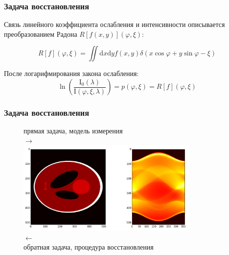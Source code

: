 \documentclass[12pt]{beamer}
\begin{document}
\begin{frame}
\frametitle{Задача восстановления}
  Связь линейного коэффициента ослабления и интенсивности описывается преобразованием Радона $R[f(x,y)](\varphi, \xi)$:

  $$
  R[f](\varphi, \xi) = 
 \iint \! \mathrm d x \mathrm d y f(x,y)\delta(x\cos\varphi + y\sin\varphi - \xi)
  $$


  После логарифмирования закона ослабления:
  $$
  \ln \left (\frac{\mathrm I_0(\lambda)}{\mathrm I(\varphi, \xi, \lambda)} \right) = p(\varphi, \xi) = R[f](\varphi, \xi)
  $$

\end{frame}

\begin{frame}
\frametitle{Задача восстановления}
\begin{figure}
\centering
    прямая задача, модель измерения\\
    $\rightarrow$
    \\
    \includegraphics[width=0.8\textwidth]{sl_sinogram}
    \\
    $\leftarrow$ \\
    обратная задача, процедура восстановления
\end{figure}
\end{frame}

% 
\end{document}
